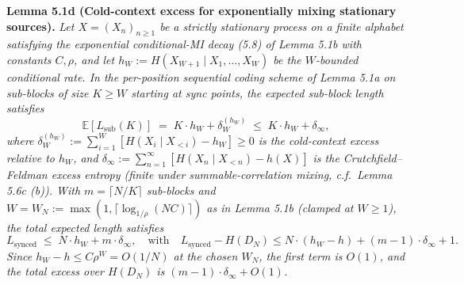 \documentclass[
]{article}
\begin{document}
\textbf{Lemma 5.1d (Cold-context excess for exponentially mixing
stationary sources).} \emph{Let $X = (X_n)_{n \geq 1}$ be a strictly
stationary process on a finite alphabet satisfying the
exponential conditional-MI decay (5.8) of Lemma 5.1b with constants
$C, \rho$, and let $h_W := H(X_{W+1} \mid X_1, \ldots, X_W)$ be the
$W$-bounded conditional rate. In the per-position sequential coding
scheme of Lemma 5.1a on sub-blocks of size $K \geq W$ starting at
sync points, the expected sub-block length satisfies}
\[
\mathbb{E}[L_{\mathrm{sub}}(K)]
\;=\; K \cdot h_W + \delta_W^{(h_W)}
\;\leq\; K \cdot h_W + \delta_\infty,
\]
\emph{where $\delta_W^{(h_W)} := \sum_{i=1}^W [H(X_i \mid X_{<i}) -
h_W] \geq 0$ is the cold-context excess relative to $h_W$, and
$\delta_\infty := \sum_{n=1}^\infty [H(X_n \mid X_{<n}) - h(X)]$ is
the Crutchfield--Feldman excess entropy (finite under
summable-correlation mixing, c.f.\ Lemma 5.6c (b)). With $m =
\lceil N/K \rceil$ sub-blocks and $W = W_N := \max(1, \lceil
\log_{1/\rho}(N C) \rceil)$ as in Lemma 5.1b (clamped at $W \geq 1$),
the total expected length satisfies}
\[
L_{\mathrm{synced}} \;\leq\; N \cdot h_W + m \cdot \delta_\infty,
\quad\text{with}\quad
L_{\mathrm{synced}} - H(D_N) \leq N \cdot (h_W - h) + (m-1) \cdot \delta_\infty + 1.
\]
\emph{Since $h_W - h \leq C \rho^W = O(1/N)$ at the chosen $W_N$, the
first term is $O(1)$, and the total excess over $H(D_N)$ is
$(m-1) \cdot \delta_\infty + O(1)$.}
\end{document}
